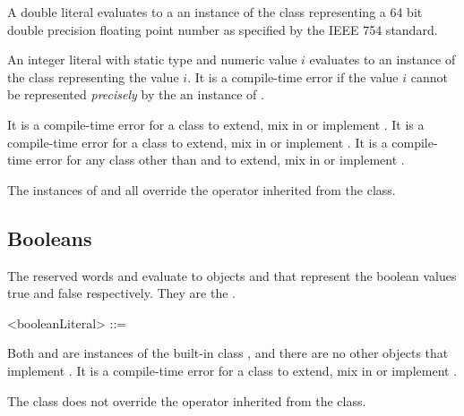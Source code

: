 \documentclass[makeidx]{article}
\begin{document}
\LMHash{}%
A double literal evaluates to a an instance of the  class
representing a 64 bit double precision floating point number
as specified by the IEEE 754 standard.

\LMHash{}%
An integer literal with static type  and numeric value $i$
evaluates to an instance of the  class representing
the value $i$. It is a compile-time error if the value $i$ cannot be
represented \emph{precisely} by the an instance of .

\LMHash{}%
It is a compile-time error for a class to extend, mix in or implement .
It is a compile-time error for a class to extend, mix in or implement .
It is a compile-time error for any class other than  and  to extend, mix in or implement .

\LMHash{}%
The instances of  and  all override the \code{==} operator inherited from the  class.

\subsection{Booleans}

\LMHash{}%
The reserved words \TRUE{} and \FALSE{} evaluate to objects
 and
that represent the boolean values true and false respectively.
They are the .

\begin{grammar}
<booleanLiteral> ::= \TRUE{}
  \alt \FALSE{}
\end{grammar}

\LMHash{}%
Both  and  are instances of
the built-in class ,
and there are no other objects that implement .
It is a compile-time error for a class to extend, mix in or implement .

\LMHash{}%
The  class does not override the \code{==} operator inherited from
the  class.
\end{document}
